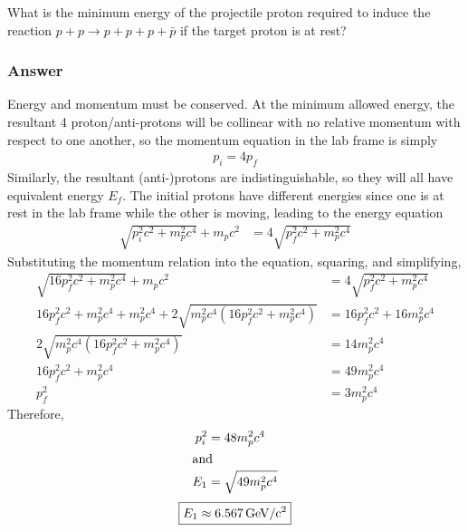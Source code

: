 What is the minimum energy of the projectile proton required to induce the
reaction $p + p \rightarrow p + p + p + \bar p$ if the target proton is at rest?

\subsubsection{Answer}
Energy and momentum must be conserved. At the minimum allowed energy, the
resultant 4 proton/anti-protons will be collinear with no relative momentum with
respect to one another, so the momentum equation in the lab frame is simply
\begin{align}
	p_i = 4p_f
\end{align}
Similarly, the resultant (anti-)protons are indistinguishable, so they will
all have equivalent energy $E_f$. The initial protons have different energies
since one is at rest in the lab frame while the other is moving, leading to
the energy equation
\begin{align*}
	\sqrt{p^2_i c^2 + m^2_p c^4} + m_p c^2 &= 4\sqrt{p^2_f c^2 + m^2_p c^4}
\end{align*}
Substituting the momentum relation into the equation, squaring, and simplifying,
\begin{align*}
	\sqrt{16p^2_f c^2 + m^2_p c^4} + m_p c^2 &= 4\sqrt{p^2_f c^2 + m^2_p c^4} \\
	16p^2_f c^2 + m^2_p c^4 + m^2_p c^4 + 2\sqrt{m^2_p c^4(16p^2_f c^2 + m^2_p c^4)}
		&= 16p^2_f c^2 + 16m^2_p c^4 \\
	2\sqrt{m^2_p c^4(16p^2_f c^2 + m^2_p c^4)} &= 14m^2_p c^4 \\
	16p^2_f c^2 + m^2_p c^4 &= 49m^2_p c^4 \\
	p^2_f &= 3m^2_p c^4
\end{align*}
Therefore,
\begin{align*}
	p^2_i &= 48m^2_p c^4 \\
\intertext{and}
	E_1 &= \sqrt{49m^2_p c^4}
\end{align*}
\begin{align}
	\boxed{
	E_1 \approx \SI{6.567}{\GeV\per c\squared}
	}
\end{align}


